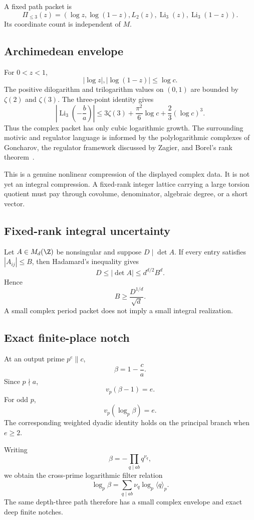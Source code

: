 A fixed path packet is
\[
 \Pi_{\le3}(z)
 =
 \left(
 \log z,
 \log(1-z),
 L_2(z),
 \operatorname{Li}_3(z),
 \operatorname{Li}_3(1-z)
 \right).
\]
Its coordinate count is independent of $M$.

\subsection{Archimedean envelope}
For $0<z<1$,
\[
 |\log z|,
 |\log(1-z)|
 \le\log c.
\]
The positive dilogarithm and trilogarithm values on $(0,1)$ are bounded by $\zeta(2)$ and $\zeta(3)$. The three-point identity gives
\[
 \left|\operatorname{Li}_3\left(-\frac ba\right)\right|
 \le
 3\zeta(3)
 +
 \frac{\pi^2}{6}\log c
 +
 \frac23(\log c)^3.
\]
Thus the complex packet has only cubic logarithmic growth. The surrounding motivic and regulator language is informed by the polylogarithmic complexes of Goncharov, the regulator framework discussed by Zagier, and Borel's rank theorem~\cite{Goncharov,ZagierPolylog,Borel}.

This is a genuine nonlinear compression of the displayed complex data. It is not yet an integral compression. A fixed-rank integer lattice carrying a large torsion quotient must pay through covolume, denominator, algebraic degree, or a short vector.

\subsection{Fixed-rank integral uncertainty}
Let $A\in M_d(\Z)$ be nonsingular and suppose $D\mid\det A$. If every entry satisfies $|A_{ij}|\le B$, then Hadamard's inequality gives
\[
 D\le|\det A|\le d^{d/2}B^d.
\]
Hence
\[
 \boxed{
 B\ge\frac{D^{1/d}}{\sqrt d}.
 }
\]
A small complex period packet does not imply a small integral realization.

\subsection{Exact finite-place notch}
At an output prime $p^e\parallel c$,
\[
 \beta=1-\frac ca.
\]
Since $p\nmid a$,
\[
 v_p(\beta-1)=e.
\]
For odd $p$,
\[
 \boxed{
 v_p(\log_p\beta)=e.
 }
\]
The corresponding weighted dyadic identity holds on the principal branch when $e\ge2$.

Writing
\[
 \beta=-\prod_{q\mid ab}q^{\nu_q},
\]
we obtain the cross-prime logarithmic filter relation
\[
 \boxed{
 \log_p\beta
 =
 \sum_{q\mid ab}
 \nu_q\log_p\langle q\rangle_p.
 }
\]
The same depth-three path therefore has a small complex envelope and exact deep finite notches.

